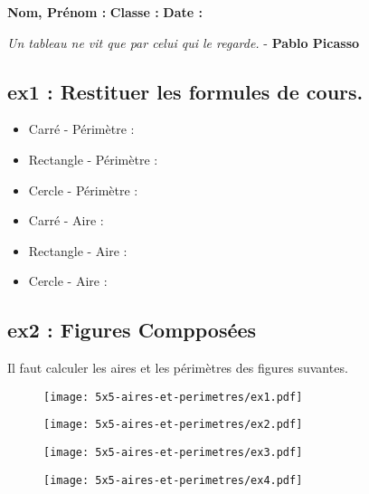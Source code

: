 



\textbf{Nom, Prénom :} \hspace{8cm} \textbf{Classe :} \hspace{3cm} \textbf{Date :}\\

\begin{center}
  \textit{Un tableau ne vit que par celui qui le regarde.}  - \textbf{Pablo Picasso}
\end{center}

\subsection*{ex1 : Restituer les formules de cours.}

\begin{multicols}{2}
\begin{itemize}
  \item Carré - Périmètre :\dotfill 
  \item Rectangle - Périmètre : \dotfill 
  \item Cercle - Périmètre : \dotfill
  \item Carré - Aire : \dotfill 
  \item Rectangle - Aire : \dotfill 
  \item Cercle - Aire : \dotfill
\end{itemize}
\end{multicols}

\subsection*{ex2 : Figures Compposées}
Il faut calculer les aires et les périmètres des figures suvantes. 

\begin{minipage}[t]{0.3\textwidth}
  \begin{figure}[H]
    \centering
    \texttt{[image: 5x5-aires-et-perimetres/ex1.pdf]}
  \end{figure}

  \begin{figure}[H]
    \centering
    \texttt{[image: 5x5-aires-et-perimetres/ex2.pdf]}
  \end{figure}
  
   \begin{figure}[H]
    \centering
    \texttt{[image: 5x5-aires-et-perimetres/ex3.pdf]}
  \end{figure}
  
  \begin{figure}[H]
    \centering
    \texttt{[image: 5x5-aires-et-perimetres/ex4.pdf]}
  \end{figure}
  
\end{minipage}
 \begin{minipage}[t]{0.7\textwidth}
   \Pointilles[40]
\end{minipage}

\newpage
\Pointilles[53]

